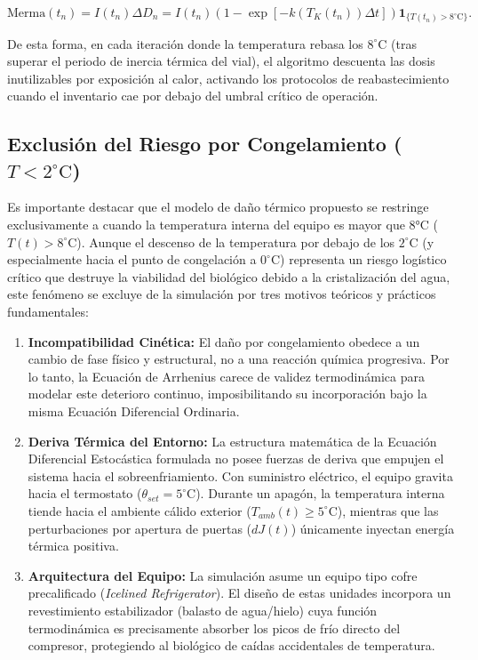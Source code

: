 \documentclass[
  spanish,
  us-letterpaper,
]{scrreprt}
\providecommand{\tightlist}{%
  \setlength{\itemsep}{0pt}\setlength{\parskip}{0pt}}
\numberwithin{equation}{section}
\theoremstyle{plain}
\theoremstyle{plain}
\theoremstyle{plain}
\theoremstyle{definition}
\theoremstyle{remark}
\begin{document}
\[
\text{Merma}(t_n) = I(t_n) \Delta D_n = I(t_n) \left( 1 - \exp\left[ -k(T_K(t_n)) \Delta t \right] \right) \mathbf{1}_{\{T(t_n) > 8^\circ\text{C}\}}.
\]

De esta forma, en cada iteración donde la temperatura rebasa los
\(8^\circ\text{C}\) (tras superar el periodo de inercia térmica del
vial), el algoritmo descuenta las dosis inutilizables por exposición al
calor, activando los protocolos de reabastecimiento cuando el inventario
cae por debajo del umbral crítico de operación.

\subsection{\texorpdfstring{Exclusión del Riesgo por Congelamiento
(\(T < 2^\circ\text{C}\))}{Exclusión del Riesgo por Congelamiento (T \textless{} 2\^{}\textbackslash circ\textbackslash text\{C\})}}\label{exclusiuxf3n-del-riesgo-por-congelamiento-t-2circtextc}

Es importante destacar que el modelo de daño térmico propuesto se
restringe exclusivamente a cuando la temperatura interna del equipo es
mayor que 8°C (\(T(t) > 8^\circ\text{C}\)). Aunque el descenso de la
temperatura por debajo de los \(2^\circ\text{C}\) (y especialmente hacia
el punto de congelación a \(0^\circ\text{C}\)) representa un riesgo
logístico crítico que destruye la viabilidad del biológico debido a la
cristalización del agua, este fenómeno se excluye de la simulación por
tres motivos teóricos y prácticos fundamentales:

\begin{enumerate}
\def\labelenumi{\arabic{enumi}.}
\tightlist
\item
  \textbf{Incompatibilidad Cinética:} El daño por congelamiento obedece
  a un cambio de fase físico y estructural, no a una reacción química
  progresiva. Por lo tanto, la Ecuación de Arrhenius carece de validez
  termodinámica para modelar este deterioro continuo, imposibilitando su
  incorporación bajo la misma Ecuación Diferencial Ordinaria.
\item
  \textbf{Deriva Térmica del Entorno:} La estructura matemática de la
  Ecuación Diferencial Estocástica formulada no posee fuerzas de deriva
  que empujen el sistema hacia el sobreenfriamiento. Con suministro
  eléctrico, el equipo gravita hacia el termostato
  (\(\theta_{set} = 5^\circ\text{C}\)). Durante un apagón, la
  temperatura interna tiende hacia el ambiente cálido exterior
  (\(T_{amb}(t) \ge 5^\circ\text{C}\)), mientras que las perturbaciones
  por apertura de puertas (\(dJ(t)\)) únicamente inyectan energía
  térmica positiva.
\item
  \textbf{Arquitectura del Equipo:} La simulación asume un equipo tipo
  cofre precalificado (\emph{Icelined Refrigerator}). El diseño de estas
  unidades incorpora un revestimiento estabilizador (balasto de
  agua/hielo) cuya función termodinámica es precisamente absorber los
  picos de frío directo del compresor, protegiendo al biológico de
  caídas accidentales de temperatura.
\end{enumerate}
\end{document}
